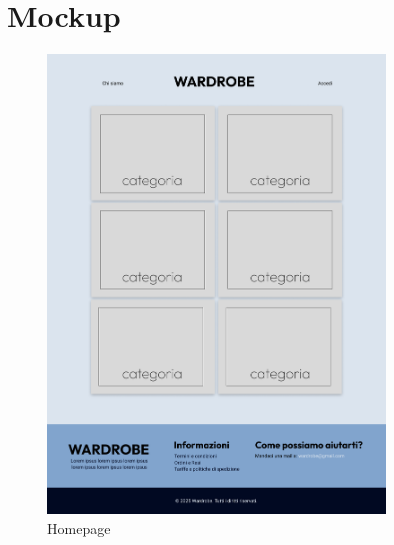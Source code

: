\clearpage
\section{Mockup}

\begin{figure}[h!]
\centering
\includegraphics[width=0.8\textwidth]{immagini/Mockups/homepage.png}
\caption{Homepage}
\end{figure}

\clearpage

